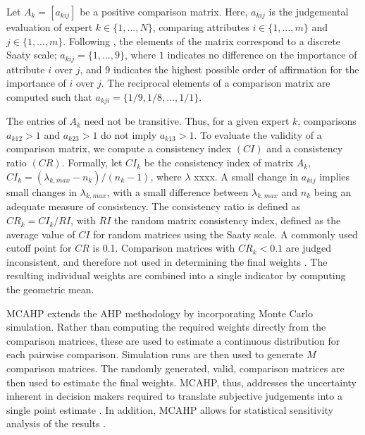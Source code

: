\documentclass[a4paper]{article}
\begin{document}
Let $A_k=[a_{kij}]$ be a positive comparison matrix.
Here, $a_{kij}$ is the judgemental evaluation of expert $k \in \lbrace 1, \dots, N \rbrace$, comparing attributes $i  \in \lbrace 1, \dots, m \rbrace $ and $j  \in \lbrace 1, \dots, m \rbrace$.
Following \citet{Saaty:1987}, the elements of the matrix correspond to a discrete Saaty scale; $a_{kij}=\lbrace 1,\dots,9\rbrace$, where $1$ indicates no difference on the importance of attribute $i$ over $j$, and $9$ indicates the highest possible order of affirmation for the importance of $i$ over $j$.
The reciprocal elements of a comparison matrix are computed such that $a_{kji}=\lbrace 1/9, 1/8,  \dots, 1/1 \rbrace$.

The entries of $A_k$ need not be transitive.
Thus, for a given expert $k$, comparisons $a_{k12}>1$ and $a_{k23}>1$ do not imply $a_{k13}>1$.
To evaluate the validity of a comparison matrix, we compute a consistency index $(CI)$ and a consistency ratio $(CR)$.
Formally, let $CI_k$ be the consistency index of matrix $A_k$, $CI_k=(\lambda_{k,max}-n_k)/(n_k-1)$, where $\lambda$ xxxx. 
A small change in $a_{kij}$ implies small changes in $\lambda_{k,max}$, with a small difference between $\lambda_{k,max}$ and $n_k$ being an adequate measure of consistency. 
The consistency ratio is defined as $CR_k=CI_k/RI$, with $RI$ the random matrix consistency index, defined as the average value of $CI$ for random matrices using the Saaty scale. 
A commonly used cutoff point for $CR$ is 0.1.
Comparison matrices with $CR_k<0.1$ are judged inconsistent, and therefore not used in determining the final weights  \citep{Ishizaka:2011, Saaty:1987}.
The resulting individual weights are combined into a single indicator by computing the geometric mean.

MCAHP extends the AHP methodology by incorporating Monte Carlo simulation.
Rather than computing the required weights directly from the comparison matrices, these are used to estimate a continuous distribution for each pairwise comparison.
Simulation runs are then used to generate $M$ comparison matrices.
The randomly generated, valid, comparison matrices are then used to estimate the final weights.
MCAHP, thus, addresses the uncertainty inherent in decision makers required to translate 
subjective judgements into a single point estimate \citep{Ataei:2013}.
In addition, MCAHP allows for statistical sensitivity analysis of the results \citep{Banuelas:2004, Vaidya:2006}. 
\end{document}
